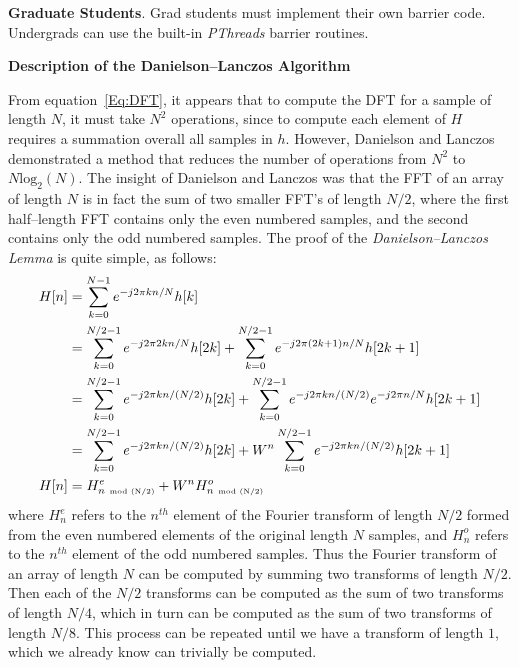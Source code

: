 \documentclass[10pt]{article}
\begin{document}
{\bf Graduate Students}.  Grad students must implement their own
barrier code.  Undergrads can use the built-in {\em PThreads}
barrier routines.

\begin{Large}
\begin{center}
{\bf Description of the Danielson--Lanczos Algorithm}
\end{center}
\end{Large}
From equation~\ref{Eq:DFT}, it appears that to compute the DFT for 
a sample of length $N$, it must take $N^2$ operations, since to compute
each element of $H$ requires a summation overall all samples in $h$.
However, Danielson and Lanczos demonstrated a method that reduces the
number of operations from $N^2$ to $N\mbox{log}_2(N)$.  The insight
of Danielson and Lanczos was that the FFT of an array of length $N$
is in fact the sum of two smaller FFT's of length $N/2$, where the
first half--length FFT contains only the even numbered samples, and the
second contains only the odd numbered samples.   The proof of the
{\em Danielson--Lanczos Lemma} is quite simple, as follows:
\begin{equation}
\label{Eq:Danielson}
\begin{aligned}
H[n] & = \sum_{k=0}^{N-1} e^{-j2\pi kn/N} h[k] \\
& = \sum_{k=0}^{N/2-1} e^{-j2\pi 2kn/N} h[2k] +
    \sum_{k=0}^{N/2-1} e^{-j2\pi (2k+1)n/N} h[2k+1] \\
& = \sum_{k=0}^{N/2-1} e^{-j2\pi kn/(N/2)} h[2k] +
    \sum_{k=0}^{N/2-1} e^{-j2\pi kn/(N/2)} e^{-j2\pi n/N} h[2k+1] \\
& = \sum_{k=0}^{N/2-1} e^{-j2\pi kn/(N/2)} h[2k] +
    W^n \sum_{k=0}^{N/2-1} e^{-j2\pi kn/(N/2)} h[2k+1] \\
H[n] & = H_{n\ \mbox{\tiny mod\ (N/2)}}^e + W^n H_{n\ \mbox{\tiny mod\ (N/2)}}^o
\end{aligned}
\end{equation}
where $H_n^e$ refers to the $n^{th}$ element of the Fourier transform
of length $N/2$ formed from the even numbered elements of the original
length $N$ samples, and $H_n^o$ refers to the $n^{th}$ element of the
odd numbered samples.  Thus the Fourier transform of an array 
of length $N$ can be computed by summing two transforms of length
$N/2$.  Then each of the $N/2$ transforms can be computed as the sum
of two transforms of length $N/4$, which in turn can be computed as
the sum of two transforms of length $N/8$.  This process can be repeated
until we have a transform of length $1$, which we already know can
trivially be computed.
\end{document}
